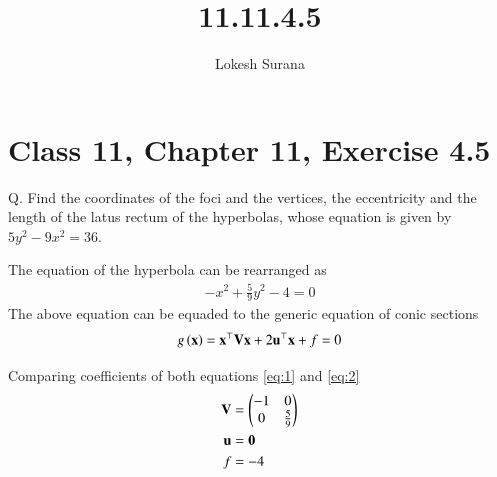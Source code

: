 \documentclass[journal,12pt,twocolumn]{IEEEtran}
\renewcommand{\vec}[1]{\boldsymbol{\mathbf{#1}}}
\begin{document}
\vspace{3cm}
\title{11.11.4.5}
\author{Lokesh Surana}
\maketitle
\section*{Class 11, Chapter 11, Exercise 4.5}
Q. Find the coordinates of the foci and the vertices, the eccentricity and the length of the latus rectum of the hyperbolas, whose equation is given by $5{y^2}-9{x^2}=36$.

The equation of the hyperbola can be rearranged as
\begin{align}
	\label{eq:1}
	-x^2 + \frac{5}{9}y^2 -4 = 0
\end{align}
The above equation can be equaded to the generic equation of conic sections
\begin{align}
	\label{eq:2}
	g\brak{\vec{x}}=\vec{x}^\top \vec{V} \vec{x} + 2\vec{u}^\top \vec{x} + f = 0
\end{align}

Comparing coefficients of both equations \eqref{eq:1} and \eqref{eq:2}
\begin{align}
	\label{3}
	\vec{V} &= \myvec{-1&0\\0&\frac{5}{9}}\\
	\vec{u} &= \vec{0}\\
	f &= -4
\end{align}
\end{document}

